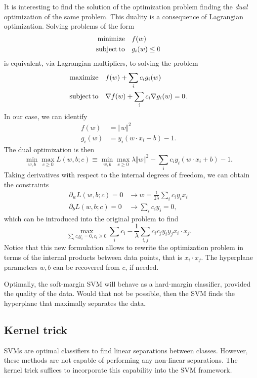 \documentclass[]{report}
\begin{document}
It is interesting to find the solution of the optimization problem finding the \textit{dual} optimization of the same problem. This duality is a consequence of Lagrangian optimization. Solving problems of the form
\begin{align}
{\rm minimize} & \quad f(w) \\
{\rm subject\, to} & \quad g_i(w) \leq 0 
\end{align}
is equivalent, via Lagrangian multipliers, to solving the problem
\begin{align}
{\rm maximize} & \quad f(w) + \sum_i c_i g_i(w) \\
{\rm subject\, to} & \quad \nabla f(w) + \sum_i c_i \nabla g_i(w) = 0.
\end{align}
In our case, we can identify
\begin{align}
f(w) & = \Vert w \Vert^2 \\ 
g_i(w) & = y_i(w \cdot x_i - b) - 1.
\end{align}
The dual optimization is then 
\begin{equation}
\min_{w, b} \max_{c \geq 0} L(w, b; c) \equiv \min_{w, b} \max_{c \geq 0} \lambda \Vert w \Vert^2 - \sum_i c_i y_i (w \cdot x_i + b) - 1.
\end{equation}
Taking derivatives with respect to the internal degrees of freedom, we can obtain the constraints
\begin{align}
\partial_w L(w, b; c) = 0 & \rightarrow w = \frac{1}{2\lambda} \sum_i c_i y_i x_i \\
\partial_b L(w, b; c) = 0 & \rightarrow \sum_i c_i y_i = 0, 
\end{align}
which can be introduced into the original problem to find
\begin{equation}
\max_{\sum_i c_i y_i = 0, c_i \geq 0} \sum_{i} c_i - \frac{1}{\lambda} \sum_{i, j} c_i c_j y_i y_j x_i \cdot x_j.
\end{equation}
Notice that this new formulation allows to rewrite the optimization problem in terms of the internal products between data points, that is $x_i \cdot x_j$. The hyperplane parameters $w, b$ can be recovered from $c$, if needed. 

Optimally, the soft-margin SVM will behave as a hard-margin classifier, provided the quality of the data. Would that not be possible, then the SVM finds the hyperplane that maximally separates the data. 
\subsection{Kernel trick}
SVMs are optimal classifiers to find linear separations between classes. However, these methods are not capable of performing any non-linear separations. The kernel trick suffices to incorporate this capability into the SVM framework.
\end{document}
